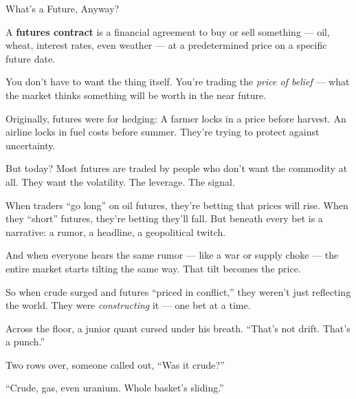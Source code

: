 \begin{TechnicalSidebar}{What’s a Future, Anyway?}

  A \textbf{futures contract} is a financial agreement to buy or sell something — oil, wheat, interest rates, even 
  weather — at a predetermined price on a specific future date.

  \medskip
  
  You don’t have to want the thing itself.  
  You’re trading the \textit{price of belief} — what the market thinks something will be worth in the near future.
  
  \medskip
  
  Originally, futures were for hedging:  
  A farmer locks in a price before harvest. An airline locks in fuel costs before summer.  
  They’re trying to protect against uncertainty.

  \medskip
  
  But today?  
  Most futures are traded by people who don’t want the commodity at all.  
  They want the volatility. The leverage. The signal.
  
  \medskip
  
  When traders “go long” on oil futures, they’re betting that prices will rise.  
  When they “short” futures, they’re betting they’ll fall.  
  But beneath every bet is a narrative: a rumor, a headline, a geopolitical twitch.

  \medskip
  
  And when everyone hears the same rumor --- like a war or supply choke --- the entire market starts tilting the same way.  
  That tilt becomes the price.
  
  \medskip
  
  So when crude surged and futures “priced in conflict,” they weren’t just reflecting the world.  
  They were \textit{constructing} it — one bet at a time.
  
\end{TechnicalSidebar}

\medskip

Across the floor, a junior quant cursed under his breath. “That’s not drift. That’s a punch.”

Two rows over, someone called out, “Was it crude?”

“Crude, gas, even uranium. Whole basket’s sliding.”


